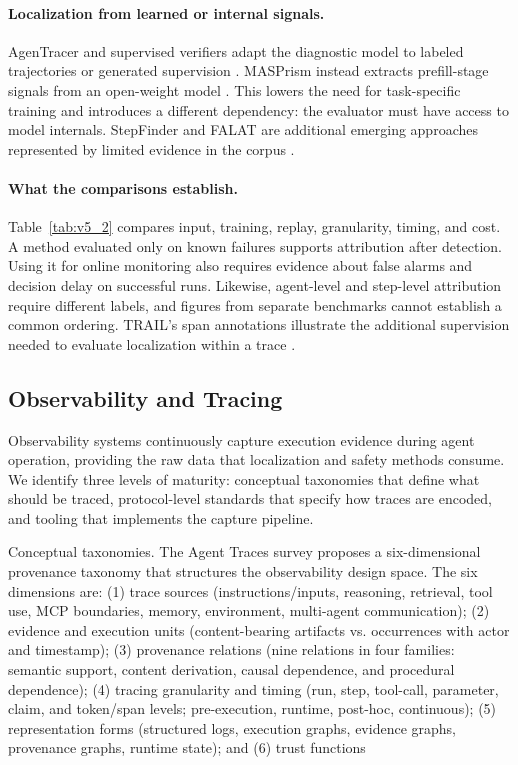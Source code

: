 \documentclass[preprint,12pt]{elsarticle}
\begin{document}
\paragraph{Localization from learned or internal signals.}
AgenTracer and supervised verifiers adapt the diagnostic model to labeled trajectories or generated supervision \cite{v5ref45,v5ref40}. MASPrism instead extracts prefill-stage signals from an open-weight model \cite{v5ref19}. This lowers the need for task-specific training and introduces a different dependency: the evaluator must have access to model internals. StepFinder and FALAT are additional emerging approaches represented by limited evidence in the corpus \cite{v5ref52,v5ref33}.

\paragraph{What the comparisons establish.}
Table~\ref{tab:v5_2} compares input, training, replay, granularity, timing, and cost. A method evaluated only on known failures supports attribution after detection. Using it for online monitoring also requires evidence about false alarms and decision delay on successful runs. Likewise, agent-level and step-level attribution require different labels, and figures from separate benchmarks cannot establish a common ordering. TRAIL's span annotations illustrate the additional supervision needed to evaluate localization within a trace \cite{v5ref10}.

\subsection{Observability and Tracing}



Observability systems continuously capture execution evidence during agent operation, providing the raw data that localization and safety methods consume. We identify three levels of maturity: conceptual taxonomies that define what should be traced, protocol-level standards that specify how traces are encoded, and tooling that implements the capture pipeline.


Conceptual taxonomies. The Agent Traces survey \cite{v5ref39} proposes a six-dimensional provenance taxonomy that structures the observability design space. The six dimensions are: (1) trace sources (instructions/inputs, reasoning, retrieval, tool use, MCP boundaries, memory, environment, multi-agent communication); (2) evidence and execution units (content-bearing artifacts vs. occurrences with actor and timestamp); (3) provenance relations (nine relations in four families: semantic support, content derivation, causal dependence, and procedural dependence); (4) tracing granularity and timing (run, step, tool-call, parameter, claim, and token/span levels; pre-execution, runtime, post-hoc, continuous); (5) representation forms (structured logs, execution graphs, evidence graphs, provenance graphs, runtime state); and (6) trust functions
\end{document}
